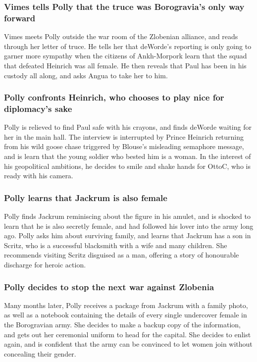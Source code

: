\subsubsection{\Gls{Vimes} tells \Gls{Polly} that the truce was Borogravia's only way forward}
\Gls{Vimes} meets \Gls{Polly} outside the war room of the Zlobenian alliance, and reads through
her letter of truce. He tells her that \Gls{deWorde}'s reporting is only going to garner more
sympathy when the citizens of Ankh-Morpork learn that the squad that defeated \Gls{Heinrich} was
all female. He then reveals that \Gls{Paul} has been in his custody all along, and asks \Gls{Angua}
to take her to him.

\subsubsection{\Gls{Polly} confronts \Gls{Heinrich}, who chooses to play nice for diplomacy's sake}
\Gls{Polly} is relieved to find \Gls{Paul} safe with his crayons, and finds \Gls{deWorde} waiting
for her in the main hall. The interview is interrupted by Prince \Gls{Heinrich} returning from his
wild goose chase triggered by \Gls{Blouse}'s misleading semaphore message, and is learn that the
young soldier who bested him is a woman. In the interest of his geopolitical ambitions, he decides
to smile and shake hands for \Gls{OttoC}, who is ready with his camera.

\subsubsection{\Gls{Polly} learns that \Gls{Jackrum} is also female}
\Gls{Polly} finds \Gls{Jackrum} reminiscing about the figure in his amulet, and is shocked to learn
that he is also secretly female, and had followed his lover into the army long ago. \Gls{Polly}
asks him about surviving family, and learns that \Gls{Jackrum} has a son in Scritz, who is a
successful blacksmith with a wife and many children. She recommends visiting Scritz disguised as a
man, offering a story of honourable discharge for heroic action.

\subsubsection{\Gls{Polly} decides to stop the next war against Zlobenia}
Many months later, \Gls{Polly} receives a package from \Gls{Jackrum} with a family photo, as well
as a notebook containing the details of every single undercover female in the Borogravian army. She
decides to make a backup copy of the information, and gets out her ceremonial uniform to head for
the capital. She decides to enlist again, and is confident that the army can be convinced to let
women join without concealing their gender.